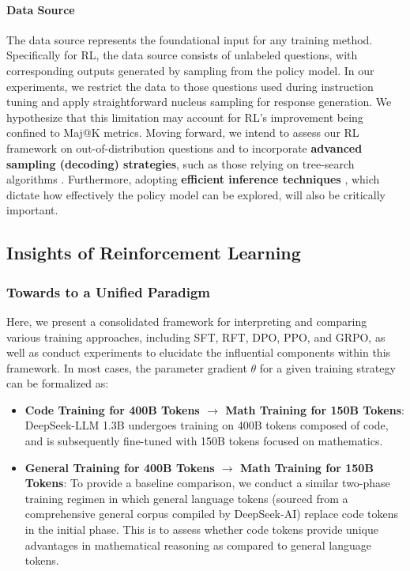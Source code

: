 \paragraph{Data Source}  
The data source represents the foundational input for any training method. Specifically for RL, the data source consists of unlabeled questions, with corresponding outputs generated by sampling from the policy model. In our experiments, we restrict the data to those questions used during instruction tuning and apply straightforward nucleus sampling for response generation. We hypothesize that this limitation may account for RL’s improvement being confined to Maj@K metrics. Moving forward, we intend to assess our RL framework on out-of-distribution questions and to incorporate \textbf{advanced sampling (decoding) strategies}, such as those relying on tree-search algorithms \citep{yao2023tree}. Furthermore, adopting \textbf{efficient inference techniques} \citep{xia-etal-2023-speculative,leviathan2023fast,kwon2023efficient,xia2024unlocking}, which dictate how effectively the policy model can be explored, will also be critically important.

\subsection{Insights of Reinforcement Learning}
\subsubsection{Towards to a Unified Paradigm} Here, we present a consolidated framework for interpreting and comparing various training approaches, including SFT, RFT, DPO, PPO, and GRPO, as well as conduct experiments to elucidate the influential components within this framework. In most cases, the parameter gradient $\theta$ for a given training strategy can be formalized as:

\begin{itemize}[topsep=0pt]
    \item \textbf{Code Training for 400B Tokens $\rightarrow$ Math Training for 150B Tokens}: DeepSeek-LLM 1.3B undergoes training on 400B tokens composed of code, and is subsequently fine-tuned with 150B tokens focused on mathematics.
    \item \textbf{General Training for 400B Tokens $\rightarrow$ Math Training for 150B Tokens}: To provide a baseline comparison, we conduct a similar two-phase training regimen in which general language tokens (sourced from a comprehensive general corpus compiled by DeepSeek-AI) replace code tokens in the initial phase. This is to assess whether code tokens provide unique advantages in mathematical reasoning as compared to general language tokens.
\end{itemize}

